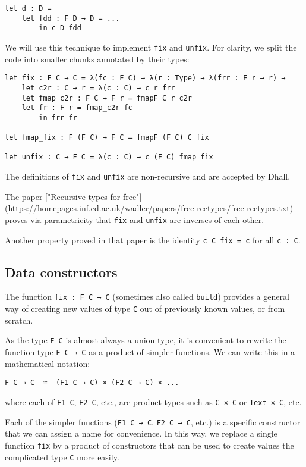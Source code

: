 \begin{lstlisting}[language=Dhall]
let d : D =
    let fdd : F D → D = ...
        in c D fdd
\end{lstlisting}


We will use this technique to implement \lstinline!fix! and \lstinline!unfix!.
For clarity, we split the code into smaller chunks annotated by their types:


\begin{lstlisting}[language=Dhall]
let fix : F C → C = λ(fc : F C) → λ(r : Type) → λ(frr : F r → r) →
    let c2r : C → r = λ(c : C) → c r frr
    let fmap_c2r : F C → F r = fmapF C r c2r
    let fr : F r = fmap_c2r fc
        in frr fr

let fmap_fix : F (F C) → F C = fmapF (F C) C fix

let unfix : C → F C = λ(c : C) → c (F C) fmap_fix
\end{lstlisting}


The definitions of \lstinline!fix! and \lstinline!unfix! are non-recursive and are accepted by Dhall.


The paper ["Recursive types for free"](https://homepages.inf.ed.ac.uk/wadler/papers/free-rectypes/free-rectypes.txt) proves via parametricity that \lstinline!fix! and \lstinline!unfix! are inverses of each other.


Another property proved in that paper is the identity \lstinline!c C fix = c! for all \lstinline!c : C!.


\subsection{Data constructors}


The function \lstinline!fix : F C → C! (sometimes also called \lstinline!build!) provides a general way of creating new values of type \lstinline!C! out of previously known values, or from scratch.


As the type \lstinline!F C! is almost always a union type, it is convenient to rewrite the function type \lstinline!F C → C! as a product of simpler functions.
We can write this in a mathematical notation:


\lstinline!F C → C  ≅  (F1 C → C) × (F2 C → C) × ... !


where each of \lstinline!F1 C!, \lstinline!F2 C!, etc., are product types such as \lstinline!C × C! or \lstinline!Text × C!, etc.


Each of the simpler functions (\lstinline!F1 C → C!, \lstinline!F2 C → C!, etc.) is a specific constructor that we can assign a name for convenience.
In this way, we replace a single function \lstinline!fix! by a product of constructors that can be used to create values the complicated type \lstinline!C! more easily.


